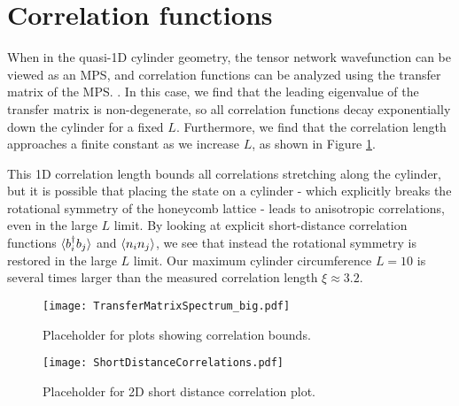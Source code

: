 
\section{Correlation functions}

 When in the quasi-1D cylinder geometry, the tensor network wavefunction can be viewed as an MPS, and correlation functions can be analyzed using the transfer matrix of the MPS. . In this case, we find that the leading eigenvalue of the transfer matrix is non-degenerate, so all correlation functions decay exponentially down the cylinder for a fixed $L$. Furthermore, we find that the correlation length approaches a finite constant as we increase $L$, as shown in Figure \ref{fig:TMS}.

This 1D correlation length bounds all correlations stretching along the cylinder, but it is possible that placing the state on a cylinder - which explicitly breaks the rotational symmetry of the honeycomb lattice - leads to anisotropic correlations, even in the large $L$ limit. By looking at explicit short-distance correlation functions $\langle b_i^{\dagger} b_j \rangle$ and $\langle n_i n_j \rangle$, we see that instead the rotational symmetry is restored in the large $L$ limit. Our maximum cylinder circumference $L=10$ is several times larger than the measured correlation length $\xi \approx 3.2$.

\begin{figure}[hbtc]
	\centering
	\texttt{[image: TransferMatrixSpectrum\_big.pdf]}
	\caption{Placeholder for plots showing correlation bounds.}
	\label{fig:TMS}
\end{figure}

\begin{figure}[hbtc]
	\centering
	\texttt{[image: ShortDistanceCorrelations.pdf]}
	\caption{Placeholder for 2D short distance correlation plot.}
	\label{fig:ShortCorr}
\end{figure}



